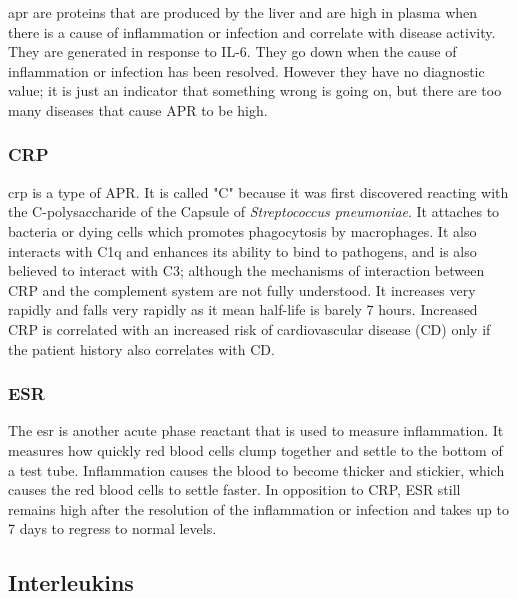\gls{apr} are proteins that are produced by the liver and are high in plasma when there is a cause of inflammation or infection and correlate with disease activity. They are generated in response to IL-6. They go down when the cause of inflammation or infection has been resolved. However they have no diagnostic value; it is just an indicator that something wrong is going on, but there are too many diseases that cause APR to be high.

\subsubsection{CRP}

\gls{crp} is a type of APR. It is called "C" because it was first discovered reacting with the C-polysaccharide of the Capsule of \textit{Streptococcus pneumoniae}. It attaches to bacteria or dying cells which promotes phagocytosis by macrophages. It also interacts with C1q and enhances its ability to bind to pathogens, and is also believed to interact with C3; although the mechanisms of interaction between CRP and the complement system are not fully understood. It increases very rapidly and falls very rapidly as it mean half-life is barely 7 hours. Increased CRP is correlated with an increased risk of cardiovascular disease (CD) only if the patient history also correlates with CD.

\subsubsection{ESR}

The \gls{esr} is another acute phase reactant that is used to measure inflammation. It measures how quickly red blood cells clump together and settle to the bottom of a test tube. Inflammation causes the blood to become thicker and stickier, which causes the red blood cells to settle faster. In opposition to CRP, ESR still remains high after the resolution of the inflammation or infection and takes up to 7 days to regress to normal levels.


\subsection{Interleukins}
\label{in:interleukins}



